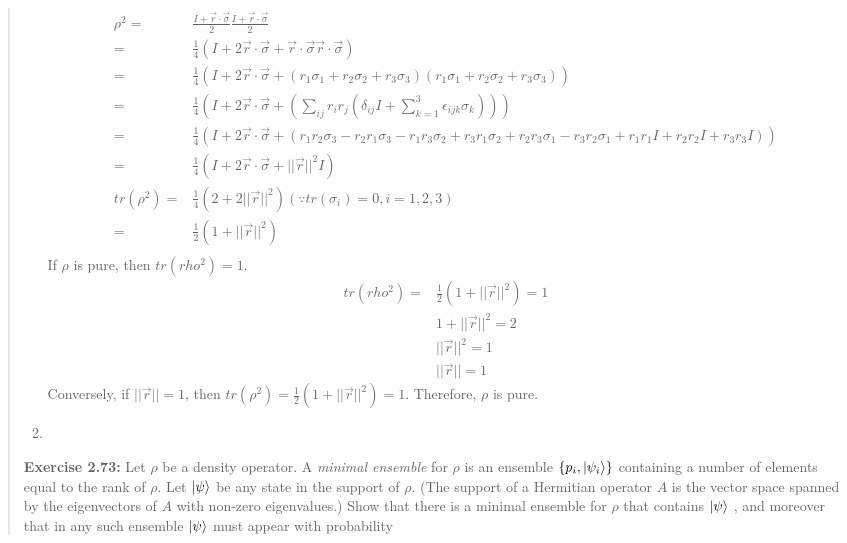 \documentclass[UTF8]{ctexart}
\begin{document}
\begin{quote}
\begin{enumerate}
\begin{equation}
\begin{aligned}
		\rho^{2}=&\frac{I+\vec{r}\cdot \vec{\sigma}}{2}\frac{I+\vec{r}\cdot \vec{\sigma}}{2} \\
				=&\frac{1}{4}\left(I+2\vec{r}\cdot \vec{\sigma}+\vec{r}\cdot \vec{\sigma}\vec{r}\cdot \vec{\sigma}\right)\\
				=&\frac{1}{4}\left(I+2\vec{r}\cdot \vec{\sigma}+(r_{1}\sigma_{1}+r_{2}\sigma_{2}+r_{3}\sigma_{3})(r_{1}\sigma_{1}+r_{2}\sigma_{2}+r_{3}\sigma_{3})\right)\\
				=&\frac{1}{4}\left(I+2\vec{r}\cdot \vec{\sigma}+(\sum_{ij}r_{i}r_{j}(\delta_{ij}I+\sum_{k=1}^{3}\epsilon_{ijk}\sigma_{k}))\right)\\
				=&\frac{1}{4}\left(I+2\vec{r}\cdot \vec{\sigma}+(r_{1}r_{2}\sigma_{3}-r_{2}r_{1}\sigma_{3}-r_{1}r_{3}\sigma_{2}+r_{3}r_{1}\sigma_{2}
				+r_{2}r_{3}\sigma_{1}-r_{3}r_{2}\sigma_{1}+r_{1}r_{1}I+r_{2}r_{2}I+r_{3}r_{3}I)\right) \\
				=&\frac{1}{4}\left(I+2\vec{r}\cdot \vec{\sigma}+||\vec{r}||^{2}I\right) \\
	tr(\rho^{2})=&\frac{1}{4}(2+2||\vec{r}||^{2}) (\because tr(\sigma_{i})=0,i=1,2,3) \\
				=&\frac{1}{2}(1+||\vec{r}||^{2})\\
	\end{aligned}
\end{equation}
If $\rho$ is pure, then $tr(rho^{2})=1 $.\\
\begin{equation}
	\begin{aligned}
		tr(rho^{2})=&\frac{1}{2}(1+||\vec{r}||^{2})=1 \\
				    &1+||\vec{r}||^{2}=2 \\
					&||\vec{r}||^{2}=1 \\
					&||\vec{r}||=1 
	\end{aligned}
\end{equation}
Conversely, if $||\vec{r}||=1$, then $tr(\rho^{2})=\frac{1}{2}(1+||\vec{r}||^{2})=1$. Therefore, $\rho$ is pure.
\\
\item 
\end{enumerate}
\textbf{Exercise 2.73:} Let $\rho$ be a density operator. A \emph{minimal ensemble}  
for $\rho$ is an ensemble $\{p_{i},\ket{\psi_{i}}\} $ containing a number of elements equal to the rank of $\rho$.
 Let $\ket{\psi}$ be any state in the support of $\rho$. (The support of a Hermitian operator $A$ is the vector
  space spanned by the eigenvectors of $A$ with non-zero eigenvalues.) Show that there is a minimal 
  ensemble for $\rho$ that contains $\ket{\psi}$ , and moreover that in any such ensemble  $\ket{\psi}$  must appear with probability

\end{quote}
\end{document}
